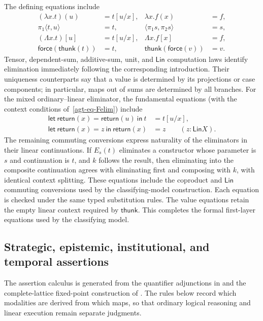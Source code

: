 \documentclass[11pt,a4paper]{article}
\numberwithin{equation}{section}
\theoremstyle{definition}
\theoremstyle{remark}
\theoremstyle{plain}
\providecommand{\Lin}{\mathsf{Lin}}
\begin{document}
The defining equations include
\begin{align*}
 (\lambda x.t)(u)&=t[u/x],&\lambda x.f(x)&=f,\\
 \pi_1\langle t,u\rangle&=t,&\langle\pi_1s,\pi_2s\rangle&=s,\\
 (\Lambda x.t)[u]&=t[u/x],&\Lambda x.f[x]&=f,\\
 \mathsf{force}(\mathsf{thunk}(t))&=t,&
 \mathsf{thunk}(\mathsf{force}(v))&=v.
\end{align*}
Tensor, dependent-sum, additive-sum, unit, and $\Lin$ computation
laws identify elimination immediately following
the corresponding introduction. Their uniqueness counterparts say
that a value is determined by its projections or case components; in
particular, maps out of sums are determined by all branches.
For the mixed ordinary--linear eliminator, the fundamental equations
(with the context conditions of~\eqref{agt-eq-Felim}) include
\[
\begin{aligned}
 \mathsf{let}\ \mathsf{return}(x)=\mathsf{return}(u)
   \ \mathsf{in}\ t&=t[u/x],\\
 \mathsf{let}\ \mathsf{return}(x)=z
   \ \mathsf{in}\ \mathsf{return}(x)&=z
       \qquad(z:\Lin X).
\end{aligned}
\]
The remaining commuting conversions express naturality of the
eliminators in their linear continuations. If $E_s(t)$ eliminates a
constructor whose parameter is $s$ and continuation is $t$, and $k$
follows the result, then eliminating into the
composite continuation agrees with eliminating first and composing
with $k$, with identical context splitting. These equations include the coproduct and $\Lin$ commuting
conversions used by the classifying-model construction. Each equation
is checked under the same typed substitution rules. The value equations
retain the empty linear context required by $\mathsf{thunk}$. This completes the formal
first-layer equations used by the classifying model.


\subsection{Strategic, epistemic, institutional, and temporal assertions}
\label{app:rules-assertions}


The assertion calculus is generated from the quantifier adjunctions
in \citet{Jacobs1999} and the complete-lattice fixed-point
construction of \citet{Tarski1955}. The rules below record which
modalities are derived from which maps, so that ordinary logical
reasoning and linear execution remain separate judgments.
\end{document}
